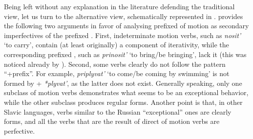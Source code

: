 
Being left without any explanation in the literature defending the traditional view, let us turn to the alternative view, schematically represented in . \citet{Regnell:44} provides the following two arguments in favor of analysing prefixed  of motion as secondary imperfectives of the prefixed . First, indeterminate motion verbs, such as \textit{nosit'}\textsubscript{\INDET} `to carry', contain (at least originally) a component of iterativity, while the corresponding prefixed , such as \textit{prinosit'} `to bring/be bringing', lack it (this was noticed already by \citealt{Mazon:1928}). Second, some verbs clearly do not follow the pattern ``+prefix''. For example, \textit{priplyvat'} `to come/be coming by swimming' is not formed by  + \textit{*plyvat'}, as the latter does not exist. Generally speaking, only one subclass of motion verbs demonstrates what seems to be an exceptional behavior, while the other subclass produces regular  forms. Another point is that, in other Slavic languages, verbs similar to the Russian ``exceptional'' ones are clearly  forms, and all the verbs that are the result of direct  of motion verbs are perfective.

